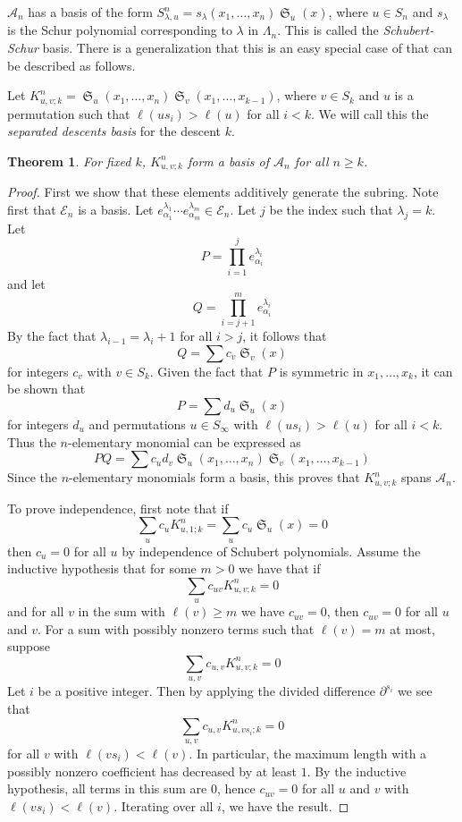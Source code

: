\documentclass{amsart}
\newtheorem{theorem}{Theorem}[section]
\theoremstyle{definition}
\theoremstyle{remark}
\numberwithin{equation}{subsection}
\DeclareMathOperator{\sch}{\mathfrak{S}}
\newcommand{\dsch}{\ensuremath{\Xi}}
\newcommand{\coma}{\mathcal{A}}
\begin{document}
$\coma_n$ has a basis of the form $S_{\lambda,u}^n=s_\lambda(x_1,\ldots,x_n)\sch_u(x)$, where $u\in S_n$ and $s_\lambda$ is the Schur polynomial corresponding to $\lambda$ in $\Lambda_n$. This is called the \emph{Schubert-Schur} basis. There is a generalization that this is an easy special case of that can be described as follows.




Let $K_{u,v;k}^n = \sch_u(x_1,\ldots,x_n)\sch_v(x_1,\ldots,x_{k-1})$, where $v\in S_k$ and $u$ is a permutation such that $\ell(us_i)>\ell(u)$ for all $i<k$. We will call this the \emph{separated descents basis} for the descent $k$.

\begin{theorem}
	For fixed $k$, $K_{u,v;k}^n$ form a basis of $\coma_n$ for all $n\geq k$.
\end{theorem}
\begin{proof}
	First we show that these elements additively generate the subring. Note first that $\mathcal{E}_n$ is a basis. Let $e_{\alpha_1}^{\lambda_1}\cdots e_{\alpha_m}^{\lambda_m}\in \mathcal{E}_n$. Let $j$ be the index such that $\lambda_j=k$. Let
	$$P=\prod_{i=1}^j e_{\alpha_i}^{\lambda_i}$$
	and let
	$$Q=\prod_{i=j+1}^{m} e_{\alpha_i}^{\lambda_i}$$
	By the fact that $\lambda_{i-1} = \lambda_i +1$ for all $i>j$, it follows that
	$$Q=\sum c_v\sch_{v}(x)$$
	for integers $c_v$ with $v\in S_k$. Given the fact that $P$ is symmetric in $x_1,\ldots,x_k$, it can be shown that
	$$P=\sum d_u\sch_u(x)$$
	for integers $d_u$ and permutations $u\in S_\infty$ with $\ell(us_i)>\ell(u)$ for all $i<k$. Thus the $n$-elementary monomial can be expressed as
	$$PQ=\sum c_ud_v\sch_u(x_1,\ldots,x_n)\sch_v(x_1,\ldots,x_{k-1})$$
	Since the $n$-elementary monomials form a basis, this proves that $K_{u,v;k}^n$ spans $\coma_n$.
	
	To prove independence, first note that if 
	$$\sum_{u} c_{u}K_{u,1;k}^n = \sum_u c_u\sch_u(x)= 0$$
	then $c_u=0$ for all $u$ by independence of Schubert polynomials. Assume the inductive hypothesis that for some $m>0$ we have that if 
	$$\sum_u c_{uv}K_{u,v;k}^n=0$$ 
	and for all $v$ in the sum with $\ell(v)\geq m$ we have $c_{uv}=0$, then $c_{uv}=0$ for all $u$ and $v$. For a sum with possibly nonzero terms such that $\ell(v)=m$ at most, suppose
	$$\sum_{u,v} c_{u,v}K_{u,v;k}^n = 0$$
	Let $i$ be a positive integer. Then by applying the divided difference $\partial^{s_i}$ we see that
	$$\sum_{u,v} c_{u,v}K_{u,vs_i;k}^n = 0$$
	for all $v$ with $\ell(vs_i)<\ell(v)$. In particular, the maximum length with a possibly nonzero coefficient has decreased by at least $1$. By the inductive hypothesis, all terms in this sum are $0$, hence $c_{uv}=0$ for all $u$ and $v$ with $\ell(vs_i) < \ell(v)$. Iterating over all $i$, we have the result.
\end{proof}
\end{document}

